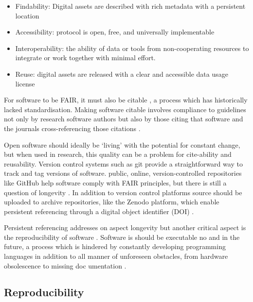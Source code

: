 \begin{itemize}
\item Findability: Digital assets are described with rich metadata with a
persistent location
\item Accessibility: protocol is open, free, and universally implementable
\item Interoperability: the ability of data or tools from non-cooperating
resources to integrate or work together with minimal effort.
\item Reuse: digital assets are released with a clear and accessible data usage
license
\end{itemize}

For software to be FAIR, it must also be citable \cite{soito_citations_2016}, a
process which has historically lacked standardisation. Making software citable
involves compliance to guidelines not only by research software authors
\cite{smith_software_2016} but also by those citing that software
\cite{katz_recognizing_2021} and the journals cross-referencing those citations
\cite{stall_journal_2023}.

Open software should ideally be `living' with the potential for constant change,
but when used in research, this quality can be a problem for cite-ability and
reusability. Version control systems such as git provide a straightforward way
to track and tag versions of software. public, online, version-controlled
repositories like GitHub help software comply with FAIR principles, but there is
still a question of longevity \cite{smith_software_2016}. In addition to version
control platforms source should be uploaded to archive repositories, like the
Zenodo platform, which enable persistent referencing through a digital object
identifier (DOI) \cite{smith_software_2016,stall_journal_2023}.

Persistent referencing addresses on aspect longevity but another critical aspect
is the reproducibility of software \cite{perkel_challenge_2020}. Software is
should be executable no and in the future, a process which is hindered by
constantly developing programming languages in addition to all manner of
unforeseen obstacles, from hardware obsolescence to missing doc umentation
\cite{robert_reproducibility_2020}.

\subsection{Reproducibility}\label{hardware-reproducibility}

